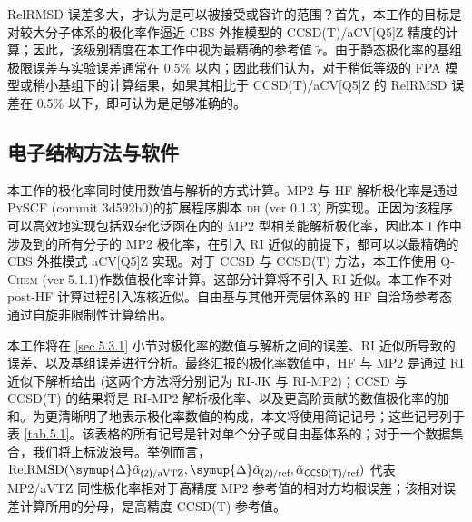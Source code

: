 RelRMSD 误差多大，才认为是可以被接受或容许的范围？首先，本工作的目标是对较大分子体系的极化率作逼近 CBS 外推模型的 CCSD(T)/aCV[Q5]Z 精度的计算；因此，该级别精度在本工作中视为最精确的参考值 $\tilde r$。由于静态极化率的基组极限误差与实验误差通常在 0.5\% 以内\cite{Brakestad-Frediani.JCTC.2020, Rumble-Rumble.CRC.2021}；因此我们认为，对于稍低等级的 FPA 模型或稍小基组下的计算结果，如果其相比于 CCSD(T)/aCV[Q5]Z 的 RelRMSD 误差在 0.5\% 以下，即可认为是足够准确的。


\subsection{电子结构方法与软件}

本工作的极化率同时使用数值与解析的方式计算。MP2 与 HF 解析极化率是通过 \textsc{PySCF} (commit 3d592b0)的扩展程序脚本 \textsc{dh} (ver 0.1.3) 所实现。正因为该程序可以高效地实现包括双杂化泛函在内的 MP2 型相关能解析极化率，因此本工作中涉及到的所有分子的 MP2 极化率，在引入 RI 近似的前提下，都可以以最精确的 CBS 外推模式 aCV[Q5]Z 实现。对于 CCSD 与 CCSD(T) 方法，本工作使用 \textsc{Q-Chem} (ver 5.1.1)作数值极化率计算。这部分计算将不引入 RI 近似。本工作不对 post-HF 计算过程引入冻核近似。自由基与其他开壳层体系的 HF 自洽场参考态通过自旋非限制性计算给出。

本工作将在 \ref{sec.5.3.1} 小节对极化率的数值与解析之间的误差、RI 近似所导致的误差、以及基组误差进行分析。最终汇报的极化率数值中，HF 与 MP2 是通过 RI 近似下解析给出 (这两个方法将分别记为 RI-JK 与 RI-MP2)；CCSD 与 CCSD(T) 的结果将是 RI-MP2 解析极化率、以及更高阶贡献的数值极化率的加和。为更清晰明了地表示极化率数值的构成，本文将使用简记记号；这些记号列于表 \ref{tab.5.1}。该表格的所有记号是针对单个分子或自由基体系的；对于一个数据集合，我们将上标波浪号。举例而言，$\text{RelRMSD} (\symup{\Delta} \tilde \alpha_{\textsf{(2)}/\text{aVTZ}}, \symup{\Delta} \tilde \alpha_{\textsf{(2)}/\text{ref}}, \tilde \alpha_{\textsf{CCSD(T)}/\text{ref}})$ 代表 MP2/aVTZ 同性极化率相对于高精度 MP2 参考值的相对方均根误差；该相对误差计算所用的分母，是高精度 CCSD(T) 参考值。

